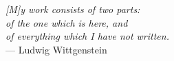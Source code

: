 
\thispagestyle{empty}


\vspace*{3cm}

\begin{center}{\slshape 
    [M]y work consists of two parts: \\
    of the one which is here, and \\
    of everything which I have not written.} \\ \medskip
    --- Ludwig Wittgenstein~\cite{Luckhardt:1979}
\end{center}

\bigskip
